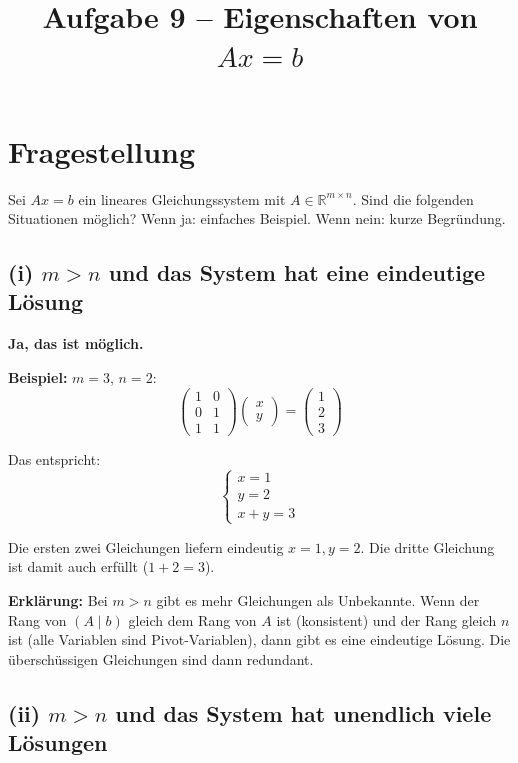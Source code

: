 \documentclass[a4paper,12pt]{article}
\title{Aufgabe 9 -- Eigenschaften von $Ax = b$}
\author{}
\date{}
\begin{document}
\maketitle

\section*{Fragestellung}

Sei $Ax = b$ ein lineares Gleichungssystem mit $A \in \mathbb{R}^{m \times n}$.
Sind die folgenden Situationen möglich? Wenn ja: einfaches Beispiel. Wenn nein: kurze Begründung.

\bigskip

\subsection*{(i) $m > n$ und das System hat eine eindeutige Lösung}

\textbf{Ja, das ist möglich.}

\textbf{Beispiel:} $m = 3$, $n = 2$:
\[
\begin{pmatrix} 1 & 0 \\ 0 & 1 \\ 1 & 1 \end{pmatrix}
\begin{pmatrix} x \\ y \end{pmatrix}
=
\begin{pmatrix} 1 \\ 2 \\ 3 \end{pmatrix}
\]

Das entspricht:
\[
\begin{cases}
x = 1 \\
y = 2 \\
x + y = 3
\end{cases}
\]

Die ersten zwei Gleichungen liefern eindeutig $x = 1, y = 2$.
Die dritte Gleichung ist damit auch erfüllt ($1 + 2 = 3$).

\textbf{Erklärung:} Bei $m > n$ gibt es mehr Gleichungen als Unbekannte. Wenn der Rang von $(A \mid b)$ gleich dem Rang von $A$ ist (konsistent) und der Rang gleich $n$ ist (alle Variablen sind Pivot-Variablen), dann gibt es eine eindeutige Lösung. Die überschüssigen Gleichungen sind dann redundant.

\bigskip

\subsection*{(ii) $m > n$ und das System hat unendlich viele Lösungen}
\end{document}
